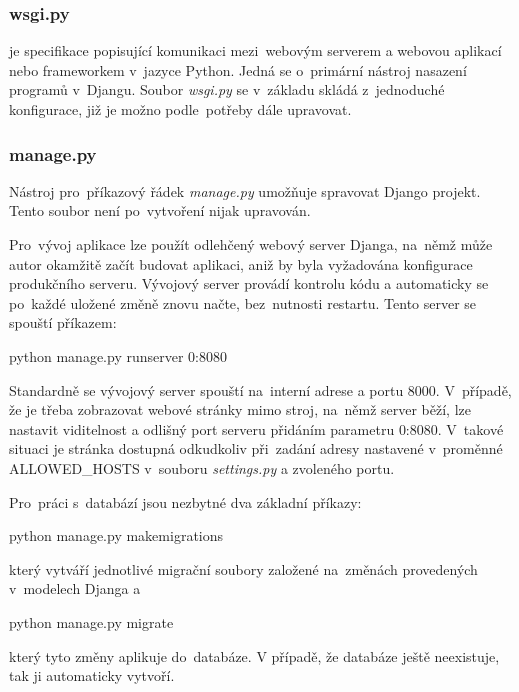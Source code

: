 \subsubsection{wsgi.py}
 je specifikace popisující komunikaci mezi~webovým serverem a
webovou aplikací nebo frameworkem v~jazyce Python. Jedná se o~primární
nástroj nasazení programů v~Djangu. Soubor \textit{wsgi.py} se v~základu 
skládá z~jednoduché  konfigurace, již je možno podle~potřeby 
dále upravovat.

\subsubsection{manage.py}
Nástroj pro~příkazový řádek \textit{manage.py} umožňuje spravovat
Django projekt. Tento soubor není po~vytvoření nijak upravován.

Pro~vývoj aplikace lze použít odlehčený webový server Djanga, na~němž
může autor okamžitě začít budovat aplikaci, aniž by byla vyžadována
konfigurace produkčního serveru. Vývojový server provádí kontrolu kódu
a automaticky se po~každé uložené změně znovu načte, bez~nutnosti
restartu. \cite{django-doc} Tento server se spouští příkazem:

\begin{center}
\textsf{python manage.py runserver 0:8080}
\end{center}

Standardně se vývojový server spouští na~interní  adrese a
portu 8000. V~případě, že je třeba zobrazovat webové stránky mimo
stroj, na~němž server běží, lze nastavit viditelnost a odlišný port
serveru přidáním parametru \textsf{0:8080}. V~takové situaci je
stránka dostupná odkudkoliv při~zadání adresy nastavené v~proměnné
\textsf{ALLOWED\_HOSTS} v~souboru \textit{settings.py} a zvoleného
portu.

Pro~práci s~databází jsou nezbytné dva základní příkazy:

\begin{center}
\textsf{python manage.py makemigrations}
\end{center}

který vytváří jednotlivé migrační soubory založené na~změnách
provedených v~modelech Djanga a

\begin{center}
\textsf{python manage.py migrate}
\end{center}

který tyto změny aplikuje do~databáze. V případě, že databáze ještě
neexistuje, tak ji automaticky vytvoří. \cite{django-doc}

